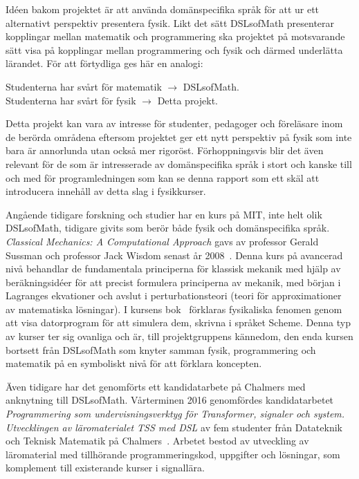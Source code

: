 Idéen bakom projektet är att använda domänspecifika språk för att ur ett alternativt perspektiv presentera fysik. Likt det sätt DSLsofMath
presenterar kopplingar mellan matematik och programmering ska projektet på motsvarande sätt visa på kopplingar mellan programmering och fysik och därmed
underlätta lärandet. För att förtydliga ges här en analogi:


\begin{center}
Studenterna har svårt för matematik $\rightarrow $ DSLsofMath.\\
Studenterna har svårt för fysik $\rightarrow $ Detta projekt.
\end{center}

Detta projekt kan vara av intresse för studenter, pedagoger och
föreläsare inom de berörda områdena eftersom projektet ger ett nytt
perspektiv på fysik som inte bara är annorlunda utan också mer rigoröst.
Förhoppningsvis blir det även relevant för de som är intresserade av
domänspecifika språk i stort och kanske till och med för programledningen som
kan se denna rapport som ett skäl att introducera innehåll av detta slag i
fysikkurser.

Angående tidigare forskning och studier har en kurs på MIT, inte helt olik
DSLsofMath, tidigare givits som berör både fysik och
domänspecifika språk.
\textit{Classical Mechanics: A Computational Approach} gavs av professor Gerald Sussman
och professor Jack Wisdom senast år 2008~\cite{classical-mechanics-course-mit-2008}.
Denna kurs på avancerad nivå behandlar de fundamentala principerna för klassisk
mekanik med hjälp av beräkningsidéer för att precist formulera principerna av
mekanik, med början i Lagranges ekvationer och avslut i perturbationsteori
(teori för approximationer av matematiska lösningar). I kursens bok~\cite{SICM}
förklaras fysikaliska fenomen genom att visa datorprogram för att simulera dem,
skrivna i språket Scheme. Denna typ av kurser ter sig ovanliga och är, till
projektgruppens kännedom, den enda kursen bortsett från DSLsofMath  som knyter
samman fysik, programmering och matematik på en symboliskt nivå för att förklara
koncepten.

Även tidigare har det genomförts ett kandidatarbete på Chalmers med anknytning till DSLsofMath.
Vårterminen 2016 genomfördes kandidatarbetet \textit{Programmering som
undervisningsverktyg för Transformer, signaler och system. Utvecklingen av
läromaterialet TSS med DSL} av fem studenter från Datateknik och Teknisk
Matematik på Chalmers~\cite{kandidat2016}. Arbetet bestod av utveckling av läromaterial med
tillhörande programmeringskod, uppgifter och lösningar, som komplement till
existerande kurser i signallära.

